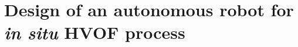\section{Design of an autonomous robot for \textit{in situ} HVOF
process}\label{sec:projeto}

 


%
 